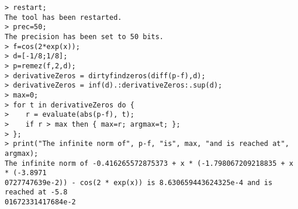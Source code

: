 \begin{center}\begin{minipage}{15cm}\begin{Verbatim}[frame=single]
> restart;
The tool has been restarted.
> prec=50;
The precision has been set to 50 bits.
> f=cos(2*exp(x));
> d=[-1/8;1/8];
> p=remez(f,2,d);
> derivativeZeros = dirtyfindzeros(diff(p-f),d);
> derivativeZeros = inf(d).:derivativeZeros:.sup(d);
> max=0;
> for t in derivativeZeros do {
>    r = evaluate(abs(p-f), t);
>    if r > max then { max=r; argmax=t; };
> };
> print("The infinite norm of", p-f, "is", max, "and is reached at", argmax);
The infinite norm of -0.416265572875373 + x * (-1.798067209218835 + x * (-3.8971
0727747639e-2)) - cos(2 * exp(x)) is 8.630659443624325e-4 and is reached at -5.8
01672331417684e-2
\end{Verbatim}
\end{minipage}\end{center}
